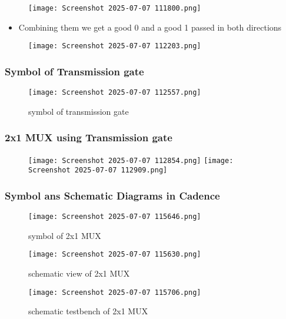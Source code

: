 \documentclass[12pt]{article}
\begin{document}
        \begin{figure}[H]
            \centering
            \texttt{[image: Screenshot 2025-07-07 111800.png]}
            \label{fig:enter-label}
        \end{figure}

        \begin{itemize}
            \item Combining them we get a good 0 and a good 1 passed in both directions 
            \end{itemize}
        \begin{figure}[H]
            \centering
            \texttt{[image: Screenshot 2025-07-07 112203.png]}
            \label{fig:enter-label}
        \end{figure}

    \subsubsection{Symbol of Transmission gate}
        \begin{figure}[H]
            \centering
            \texttt{[image: Screenshot 2025-07-07 112557.png]}
            \caption{symbol of transmission gate}
            \label{fig:enter-label}
        \end{figure}

    \subsubsection{2x1 MUX using Transmission gate}
        \begin{figure}[H]
           \hfill
            \texttt{[image: Screenshot 2025-07-07 112854.png]}
            \texttt{[image: Screenshot 2025-07-07 112909.png]}
            \label{fig:enter-label}
        \end{figure}
    
    \subsubsection{Symbol ans Schematic Diagrams in Cadence}
       \begin{figure}[H]
           \centering
           \texttt{[image: Screenshot 2025-07-07 115646.png]}
           \caption{symbol of 2x1 MUX}
           \label{fig:enter-label}
       \end{figure}
       \begin{figure}[H]
           \centering
           \texttt{[image: Screenshot 2025-07-07 115630.png]}
           \caption{schematic view of 2x1 MUX}
           \label{fig:enter-label}
       \end{figure}
       \begin{figure}[H]
           \centering
           \texttt{[image: Screenshot 2025-07-07 115706.png]}
           \caption{schematic testbench of 2x1 MUX}
           \label{fig:enter-label}
       \end{figure}
\end{document}
